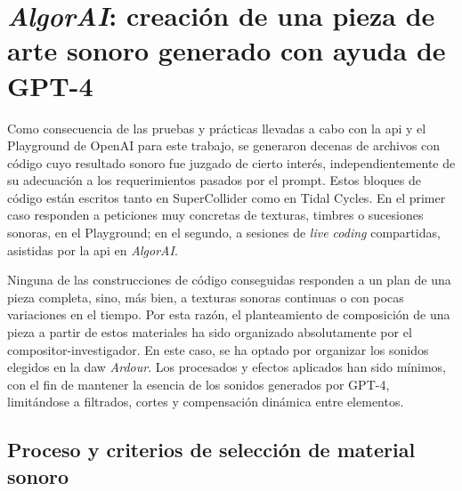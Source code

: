 \chapter{\emph{AlgorAI}: creación de una pieza de arte sonoro generado con ayuda de GPT-4}
\label{chap:algorai}


\vspace{1cm}

Como consecuencia de las pruebas y prácticas llevadas a cabo con la \gls{api} y el Playground de OpenAI para este trabajo, se generaron decenas de archivos con código cuyo resultado sonoro fue juzgado de cierto interés, independientemente de su adecuación a los requerimientos pasados por el prompt. Estos bloques de código están escritos tanto en SuperCollider como en Tidal Cycles. En el primer caso responden a peticiones muy concretas de texturas, timbres o sucesiones sonoras, en el Playground; en el segundo, a sesiones de \emph{live coding} compartidas, asistidas por la \gls{api} en \emph{AlgorAI}.

Ninguna de las construcciones de código conseguidas responden a un plan de una pieza completa, sino, más bien, a texturas sonoras continuas o con pocas variaciones en el tiempo. Por esta razón, el planteamiento de composición de una pieza a partir de estos materiales ha sido organizado absolutamente por el compositor-investigador. En este caso, se ha optado por organizar los sonidos elegidos en la \gls{daw} \emph{Ardour}. Los procesados y efectos aplicados han sido mínimos, con el fin de mantener la esencia de los sonidos generados por GPT-4, limitándose a filtrados, cortes y compensación dinámica entre elementos. 




\section{Proceso y criterios de selección de material sonoro}

